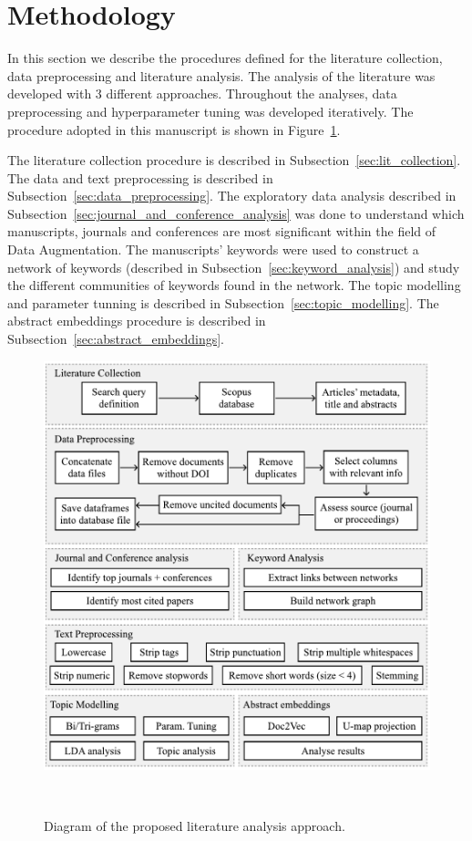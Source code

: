 \documentclass[parskip=full]{scrartcl}
\begin{document}
\section{Methodology}

In this section we describe the procedures defined for the literature
collection, data preprocessing and literature analysis. The analysis of the
literature was developed with 3 different approaches. Throughout the
analyses, data preprocessing and hyperparameter tuning was developed
iteratively. The procedure adopted in this manuscript is shown in
Figure~\ref{fig:slr_diagram}.

The literature collection procedure is described in
Subsection~\ref{sec:lit_collection}. The data and text preprocessing is
described in Subsection~\ref{sec:data_preprocessing}. The exploratory data
analysis described in Subsection~\ref{sec:journal_and_conference_analysis} was
done to understand which manuscripts, journals and conferences are most
significant within the field of Data Augmentation. The manuscripts' keywords
were used to construct a network of keywords (described in
Subsection~\ref{sec:keyword_analysis}) and study the different communities of
keywords found in the network. The topic modelling and parameter tunning is described in
Subsection~\ref{sec:topic_modelling}. The abstract embeddings procedure is
described in Subsection~\ref{sec:abstract_embeddings}.

\begin{figure}[H]
	\centering
	\includegraphics[width=.75\linewidth]{../analysis/slr_diagram}
    \caption{Diagram of the proposed literature analysis approach.
    }~\label{fig:slr_diagram}
\end{figure}
\end{document}
